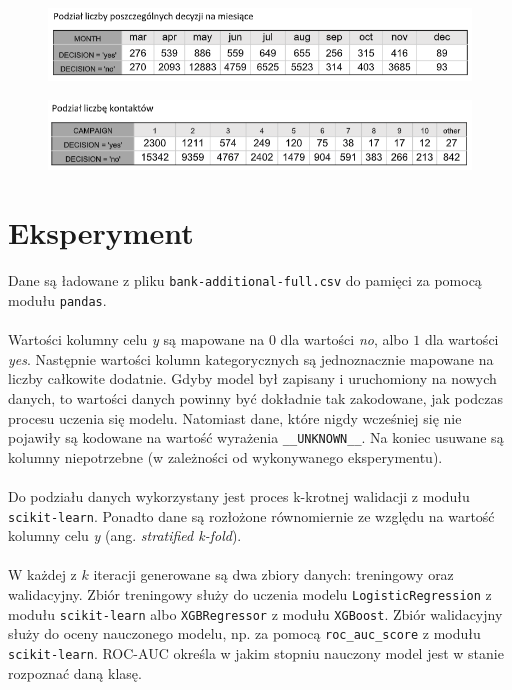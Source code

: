 \documentclass[12pt,a4paper]{article}
\begin{document}
\begin{figure}[H]
	\centering
	\includegraphics[scale=0.65]{data_6.png}
\end{figure}

\begin{figure}[H]
	\centering
	\includegraphics[scale=0.65]{data_7.png}
\end{figure}

\section*{Eksperyment}
Dane są ładowane z pliku \texttt{bank-additional-full.csv} do pamięci za pomocą modułu \texttt{pandas}.
\\
\\
Wartości kolumny celu \textit{y} są mapowane na $0$ dla wartości \textit{no}, albo $1$ dla wartości \textit{yes}. Następnie wartości kolumn kategorycznych są jednoznacznie mapowane na liczby całkowite dodatnie. Gdyby model był zapisany i uruchomiony na nowych danych, to wartości danych powinny być dokładnie tak zakodowane, jak podczas procesu uczenia się modelu. Natomiast dane, które nigdy wcześniej się nie pojawiły są kodowane na wartość wyrażenia \texttt{\_\_UNKNOWN\_\_}. Na koniec usuwane są kolumny niepotrzebne (w zależności od wykonywanego eksperymentu).
\\
\\
Do podziału danych wykorzystany jest proces k-krotnej walidacji z modułu \texttt{scikit-learn}. Ponadto dane są rozłożone równomiernie ze względu na wartość kolumny celu \textit{y} (ang. \textit{stratified k-fold}).
\\
\\
W każdej z $k$ iteracji generowane są dwa zbiory danych: treningowy oraz walidacyjny. Zbiór treningowy służy do uczenia modelu \texttt{LogisticRegression} z modułu \texttt{scikit-learn} albo \texttt{XGBRegressor} z modułu \texttt{XGBoost}. Zbiór walidacyjny służy do oceny nauczonego modelu, np. za pomocą \texttt{roc\_auc\_score} z modułu \texttt{scikit-learn}. ROC-AUC określa w jakim stopniu nauczony model jest w stanie rozpoznać daną klasę.
\end{document}
